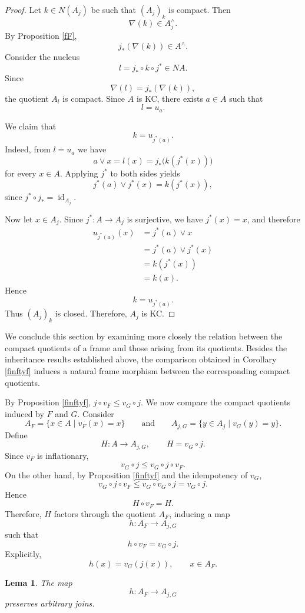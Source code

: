 \documentclass[11pt]{amsart}
\DeclareMathOperator{\id}{id}
\theoremstyle{plain}
\newtheorem{lem}[thm]{Lema}
\theoremstyle{definition}
\begin{document}
\begin{proof}
Let $k\in N(A_j)$ be such that $(A_j)_k$ is compact. Then
\[
\nabla(k)\in A_j^\wedge.
\]
By Proposition \ref{fF},
\[
j_*(\nabla(k))\in A^\wedge.
\]
Consider the nucleus
\[
l=j_*\circ k\circ j^*\in NA.
\]
Since
\[
\nabla(l)=j_*(\nabla(k)),
\]
the quotient $A_l$ is compact. Since $A$ is KC, there exists $a\in A$ such that
\[
l=u_a.
\]

We claim that
\[
k=u_{j^*(a)}.
\]
Indeed, from $l=u_a$ we have
\[
a\vee x
=
l(x)
=
j_*\bigl(k(j^*(x))\bigr)
\]
for every $x\in A$. Applying $j^*$ to both sides yields
\[
j^*(a)\vee j^*(x)
=
k(j^*(x)),
\]
since $j^*\circ j_*=\id_{A_j}$.

Now let $x\in A_j$. Since $j^*\colon A\to A_j$ is surjective, we have
$j^*(x)=x$, and therefore
\[
\begin{aligned}
u_{j^*(a)}(x)
&=j^*(a)\vee x\\
&=j^*(a)\vee j^*(x)\\
&=k(j^*(x))\\
&=k(x).
\end{aligned}
\]
Hence
\[
k=u_{j^*(a)}.
\]
Thus $(A_j)_k$ is closed. Therefore, $A_j$ is KC.
\end{proof}

We conclude this section by examining more closely the relation between
the compact quotients of a frame and those arising from its quotients.
Besides the inheritance results established above, the comparison
obtained in Corollary \ref{finftyf} induces a natural frame morphism between the
corresponding compact quotients.

By Proposition \ref{finftyf}, $j\circ v_F\leq v_G\circ j$. We now compare the compact quotients induced
by \(F\) and \(G\). Consider
\[
    A_F=\{x\in A\mid v_F(x)=x\}
    \qquad\text{and}\qquad
    A_{j,G}=\{y\in A_j\mid v_G(y)=y\}.
\]
Define
\[
    H\colon A\longrightarrow A_{j,G},
    \qquad
    H=v_G\circ j.
\]
Since \(v_F\) is inflationary,
\[
    v_G\circ j
    \leq
    v_G\circ j\circ v_F.
\]
On the other hand, by Proposition \ref{finftyf} and the idempotency of \(v_G\),
\[
    v_G\circ j\circ v_F
    \leq
    v_G\circ v_G\circ j
    =
    v_G\circ j.
\]
Hence
\[
    H\circ v_F=H.
\]
Therefore, \(H\) factors through the quotient \(A_F\), inducing a map
\[
    h\colon A_F\longrightarrow A_{j,G}
\]
such that
\[
    h\circ v_F=v_G\circ j.
\]
Explicitly,
\[
    h(x)=v_G(j(x)),
    \qquad x\in A_F.
\]

\begin{lem}\label{bigvee g}
The map
\[
    h\colon A_F\longrightarrow A_{j,G}
\]
preserves arbitrary joins.
\end{lem}
\end{document}
